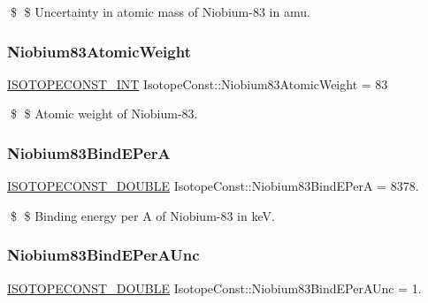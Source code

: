 \$ \$ Uncertainty in atomic mass of Niobium-\/83 in amu. \mbox{\label{group___isotope_const-_niobium-_nb83_gaff190c66982fa4e4eca3247688f96d16}} 
\subsubsection{\texorpdfstring{Niobium83\+Atomic\+Weight}{Niobium83AtomicWeight}}
{\footnotesize\ttfamily \mbox{\hyperlink{group___isotope_const-_macros_ga5f18360b3e99483a35c32d789e62621c}{I\+S\+O\+T\+O\+P\+E\+C\+O\+N\+S\+T\+\_\+\+I\+NT}} Isotope\+Const\+::\+Niobium83\+Atomic\+Weight = 83}

\$ \$ Atomic weight of Niobium-\/83. \mbox{\label{group___isotope_const-_niobium-_nb83_ga53d8012606f99c8923ab74b75d9824e6}} 
\subsubsection{\texorpdfstring{Niobium83\+Bind\+E\+PerA}{Niobium83BindEPerA}}
{\footnotesize\ttfamily \mbox{\hyperlink{group___isotope_const-_macros_ga8f45a7272ce02c0b4c65c44636ed719a}{I\+S\+O\+T\+O\+P\+E\+C\+O\+N\+S\+T\+\_\+\+D\+O\+U\+B\+LE}} Isotope\+Const\+::\+Niobium83\+Bind\+E\+PerA = 8378.}

\$ \$ Binding energy per A of Niobium-\/83 in keV. \mbox{\label{group___isotope_const-_niobium-_nb83_ga27adbc0abfb6652fbc4d95bdec20e2ab}} 
\subsubsection{\texorpdfstring{Niobium83\+Bind\+E\+Per\+A\+Unc}{Niobium83BindEPerAUnc}}
{\footnotesize\ttfamily \mbox{\hyperlink{group___isotope_const-_macros_ga8f45a7272ce02c0b4c65c44636ed719a}{I\+S\+O\+T\+O\+P\+E\+C\+O\+N\+S\+T\+\_\+\+D\+O\+U\+B\+LE}} Isotope\+Const\+::\+Niobium83\+Bind\+E\+Per\+A\+Unc = 1.}

